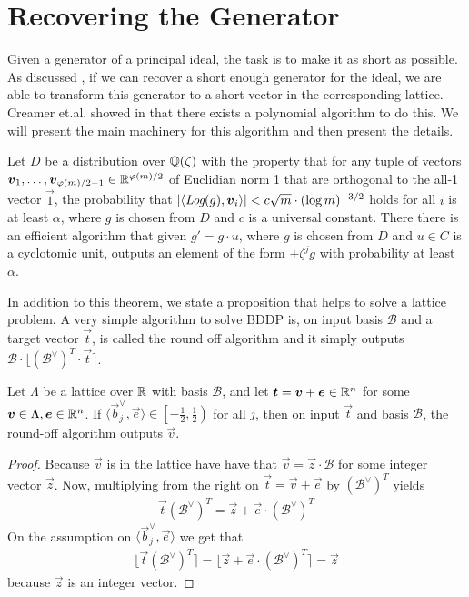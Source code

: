 \section{Recovering the Generator}
Given a generator of a principal ideal, the task is to make it as short as possible. As discussed , if we can recover a short enough generator for the ideal, we are able to transform this generator to a short vector in the corresponding lattice. Creamer et.al. showed in \cite{Recover Short Gen} that there exists a polynomial algorithm to do this. We will present the main machinery for this algorithm and then present the details.

\begin{theorem}
\label{Thm: Recover Short Gen}
    Let \(D\) be a distribution over \(\QQ(\zeta)\) with the property that for any tuple of vectors \(\vec{v}_1,\dots ,\vec{v}_{\varphi(m)/2 - 1}\in\RR^{\varphi(m)/2}\) of Euclidian norm 1 that are orthogonal to the all-1 vector \(\vec{1}\), the probability that \(|\langle\emph{Log}(g), \vec{v}_i\rangle| < c\sqrt{m}\cdot (\log m)^{-3/2}\) holds for all \(i\) is at least \(\alpha\), where \(g\) is chosen from \(D\) and \(c\) is a universal constant. There there is an efficient algorithm that given \(g' = g\cdot u\), where \(g\) is chosen from \(D\) and \(u\in C\) is a cyclotomic unit, outputs an element of the form \(\pm\zeta^j g\) with probability at least \(\alpha\).
\end{theorem}
In addition to this theorem, we state a proposition that helps to solve a lattice problem. A very simple algorithm to solve BDDP is, on input basis \(\mathcal{B}\) and a target vector \(\vec{t}\), is called the round off algorithm and it simply outputs \(\mathcal{B}\cdot\lfloor({\mathcal{B}^\vee})^T\cdot\vec{t}\rceil\).
\begin{proposition}
\label{Prop: Round off Algorithm}
    Let \(\Lambda\) be a lattice over \(\RR\) with basis \(\mathcal{B}\), and let \(\vec{t} = \vec{v} + \vec{e} \in\RR^n\) for some \(\vec{v}\in\Lambda, \vec{e}\in\RR^n\). If \(\langle\vec{b}_j^\vee, \vec{e}\rangle\in\left[-\frac{1}{2},\frac{1}{2}\right)\) for all \(j\), then on input \(\vec{t}\) and basis \(\mathcal{B}\), the round-off algorithm outputs \(\vec{v}\).
\end{proposition}
\begin{proof}
Because \(\vec{v}\) is in the lattice have have that \(\vec{v} = \vec{z}\cdot\mathcal{B}\) for some integer vector \(\vec{z}\). Now, multiplying from the right on \(\vec{t} = \vec{v} + \vec{e}\) by \({(\mathcal{B}^\vee)^T}\) yields 
\begin{align*}
    \vec{t} {(\mathcal{B}^\vee)^T} = \vec{z} + \vec{e}\cdot{(\mathcal{B}^\vee)^T}
\end{align*} On the assumption on \(\langle\vec{b}_j^\vee, \vec{e}\rangle\) we get that
\begin{align*}
    \lfloor\vec{t} {(\mathcal{B}^\vee)^T}\rceil = \lfloor \vec{z} + \vec{e}\cdot{(\mathcal{B}^\vee)^T} \rceil = \vec{z}
\end{align*}
because \(\vec{z}\) is an integer vector.
\end{proof}
